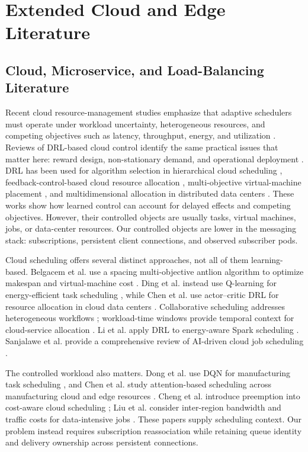 \section{Extended Cloud and Edge Literature}
\label{app:extended-literature}
\subsection{Cloud, Microservice, and Load-Balancing Literature}

Recent cloud resource-management studies emphasize that adaptive schedulers
must operate under workload uncertainty, heterogeneous resources, and competing
objectives such as latency, throughput, energy, and utilization
\cite{Khan2022MLCloudReview}. Reviews of DRL-based cloud control identify the
same practical issues that matter here: reward design, non-stationary demand,
and operational deployment \cite{Zhou2024DRLCloudReview}. DRL has been used
for algorithm selection in hierarchical cloud scheduling
\cite{Zhou2022DRLSelector}, feedback-control-based cloud resource allocation
\cite{Chen2022RLFeedback}, multi-objective virtual-machine placement
\cite{Caviglione2021VMPlacement}, and multidimensional allocation in
distributed data centers \cite{Wei2023TNSM}. These works show how learned
control can account for delayed effects and competing objectives.
However, their controlled objects are usually tasks, virtual machines, jobs, or
data-center resources. Our controlled objects are lower in the messaging
stack: subscriptions, persistent client connections, and observed subscriber
pods.

Cloud scheduling offers several distinct approaches, not all of them
learning-based. Belgacem et al. use a spacing multi-objective antlion algorithm
to optimize makespan and virtual-machine cost \cite{Belgacem2020DynamicResource}.
Ding et al. instead use Q-learning for energy-efficient task scheduling
\cite{Ding2020QLearningCloud}, while Chen et al. use actor--critic DRL for
resource allocation in cloud data centers \cite{Chen2022ActorCritic}.
Collaborative scheduling addresses heterogeneous workflows
\cite{Chen2023CollaborativeScheduling}; workload-time windows provide temporal
context for cloud-service allocation \cite{Chen2023WorkloadWindows}.
Li et al. apply DRL to energy-aware Spark scheduling \cite{Li2023SparkDRL}.
Sanjalawe et al. provide a comprehensive review of AI-driven cloud job
scheduling \cite{Sanjalawe2025AIJobScheduling}.

The controlled workload also matters. Dong et al. use DQN for manufacturing
task scheduling \cite{Dong2020CloudManufacturing}, and Chen et al. study
attention-based scheduling across manufacturing cloud and edge resources
\cite{Chen2023CloudEdgeManufacturing}. Cheng et al. introduce preemption into
cost-aware cloud scheduling \cite{Cheng2023PreemptiveCloud}; Liu et al. consider
inter-region bandwidth and traffic costs for data-intensive jobs
\cite{Liu2026GeoDRL}. These papers supply scheduling context. Our problem
instead requires subscription reassociation while retaining queue identity
and delivery ownership across persistent connections.

